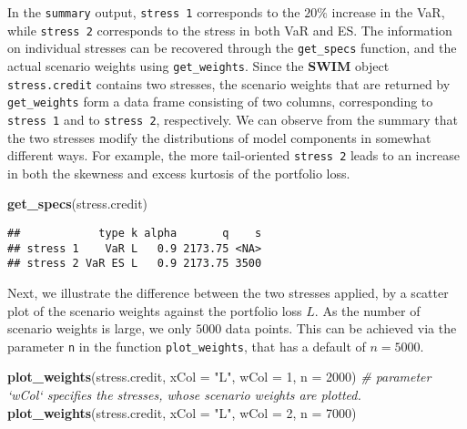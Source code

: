 \documentclass[
]{article}
\newenvironment{Shaded}{\begin{snugshade}}{\end{snugshade}}
\newcommand{\CommentTok}[1]{\textcolor[rgb]{0.56,0.35,0.01}{\textit{#1}}}
\newcommand{\DataTypeTok}[1]{\textcolor[rgb]{0.13,0.29,0.53}{#1}}
\newcommand{\DecValTok}[1]{\textcolor[rgb]{0.00,0.00,0.81}{#1}}
\newcommand{\KeywordTok}[1]{\textcolor[rgb]{0.13,0.29,0.53}{\textbf{#1}}}
\newcommand{\NormalTok}[1]{#1}
\newcommand{\StringTok}[1]{\textcolor[rgb]{0.31,0.60,0.02}{#1}}
\begin{document}
In the \texttt{summary} output, \texttt{stress\ 1} corresponds to the \(20\%\) increase in the VaR, while \texttt{stress\ 2} corresponds to the stress in both VaR and ES. The information on individual stresses can be recovered through the \texttt{get\_specs} function, and the actual scenario weights using \texttt{get\_weights}. Since the \textbf{SWIM} object \texttt{stress.credit} contains two stresses, the scenario weights that are returned by \texttt{get\_weights} form a data frame consisting of two columns, corresponding to \texttt{stress\ 1} and to \texttt{stress\ 2}, respectively. We can observe from the summary that the two stresses modify the distributions of model components in somewhat different ways. For example, the more tail-oriented \texttt{stress\ 2} leads to an increase in both the skewness and excess kurtosis of the portfolio loss.

\begin{Shaded}
\begin{Highlighting}[]
\KeywordTok{get_specs}\NormalTok{(stress.credit)}
\end{Highlighting}
\end{Shaded}

\begin{verbatim}
##            type k alpha       q    s
## stress 1    VaR L   0.9 2173.75 <NA>
## stress 2 VaR ES L   0.9 2173.75 3500
\end{verbatim}

Next, we illustrate the difference between the two stresses applied, by a scatter plot of the scenario weights against the portfolio loss \(L\). As the number of scenario weights is large, we only \(5000\) data points. This can be achieved via the parameter \texttt{n} in the function \texttt{plot\_weights}, that has a default of \(n = 5000\).

\begin{Shaded}
\begin{Highlighting}[]
\KeywordTok{plot_weights}\NormalTok{(stress.credit, }\DataTypeTok{xCol =} \StringTok{"L"}\NormalTok{, }\DataTypeTok{wCol =} \DecValTok{1}\NormalTok{, }\DataTypeTok{n =} \DecValTok{2000}\NormalTok{)}
\CommentTok{# parameter `wCol` specifies the stresses, whose scenario weights are plotted.}
\KeywordTok{plot_weights}\NormalTok{(stress.credit, }\DataTypeTok{xCol =} \StringTok{"L"}\NormalTok{, }\DataTypeTok{wCol =} \DecValTok{2}\NormalTok{, }\DataTypeTok{n =} \DecValTok{7000}\NormalTok{)}
\end{Highlighting}
\end{Shaded}
\end{document}

